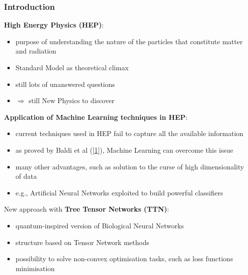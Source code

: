 \documentclass[xcolor=table,8pt]{beamer}
\begin{document}
    \begin{frame}[t]
        \frametitle{Introduction}
        
        \textbf{High Energy Physics (HEP)}:
        \begin{itemize}
            \item purpose of understanding the nature of the particles that constitute matter and radiation
            \item Standard Model as theoretical climax
            \item still lots of unanswered questions
            \item \( \Rightarrow \) \alert{still New Physics to discover}
        \end{itemize}
        
        \bigskip
        \textbf{Application of Machine Learning techniques in HEP}:
        \begin{itemize}
            \item current techniques used in HEP fail to capture all the available information
            \item as proved by Baldi et al ([\href{https://arxiv.org/pdf/1402.4735.pdf}{\alert{1}}]), Machine Learning can overcome this issue
            \item many other advantages, such as solution to the curse of high dimensionality of data
            \item e.g., Artificial Neural Networks exploited to build powerful classifiers
        \end{itemize}
        
        \bigskip
        New approach with \textbf{Tree Tensor Networks (TTN)}:
        \begin{itemize}
            \item \alert{quantum-inspired} version of Biological Neural Networks
            \item structure based on \alert{Tensor Network methods}
            \item possibility to solve non-convex optimisation tasks, such as loss functions minimisation
        \end{itemize}
    \end{frame}
\end{document}
